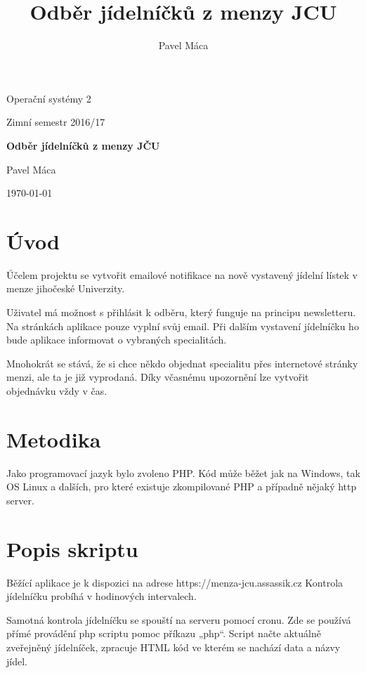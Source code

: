 \documentclass[a4]{article}
\title{Odběr jídelníčků z menzy JCU}
\author{Pavel Máca}
\begin{document}
\begin{titlepage}
	\centering
	{\Huge Operační systémy 2\par}
	\vspace{1cm}
	{\Large Zimní semestr 2016/17\par}
	\vspace{1.5cm}
	{\huge\bfseries Odběr jídelníčků z menzy JČU\par}
	\vspace{2cm}
	{\Large Pavel Máca\par}
	\vfill


	{\large \today\par}
\end{titlepage}

\pagebreak

\section{Úvod}
Účelem projektu se vytvořit emailové notifikace na nově vystavený jídelní lístek v menze jihočeské Univerzity.

Uživatel má možnost s přihlásit k odběru, který funguje na principu newsletteru. Na stránkách aplikace pouze vyplní svůj email. Při dalším vystavení jídelníčku ho bude aplikace informovat o vybraných specialitách.

Mnohokrát se stává, že si chce někdo objednat specialitu přes internetové stránky menzi, ale ta je již vyprodaná. Díky včasnému upozornění lze vytvořit objednávku vždy v čas.


\section{Metodika}
Jako programovací jazyk bylo zvoleno PHP. Kód může běžet jak na Windows, tak OS Linux  a dalších, pro které existuje zkompilované PHP a případně nějaký http server.

\section{Popis skriptu}
Běžící aplikace je k dispozici na adrese https://menza-jcu.assassik.cz 
Kontrola jídelníčku probíhá v hodinových intervalech.

Samotná kontrola jídelníčku se spouští na serveru pomocí cronu. Zde se používá přímé provádění php scriptu pomoc příkazu „php“. Script načte aktuálně zveřejněný jídelníček, zpracuje HTML kód ve kterém se nachází data a názvy jídel.
\end{document}
